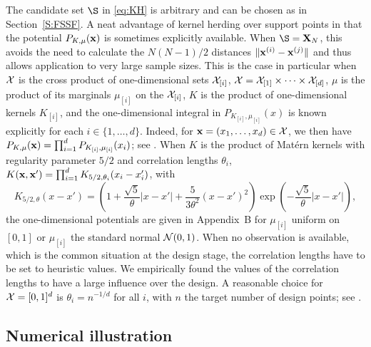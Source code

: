 The candidate set $\S$ in \eqref{eq:KH} is arbitrary and can be chosen as in Section~\ref{S:FSSF}. 
A neat advantage of kernel herding over support points in that the potential $P_{K,\mu}({\bf x})$ is sometimes explicitly available. When $\S=\bX_N$, this avoids the need to calculate the $N(N-1)/2$ distances $\|{\bf x}^{(i)}-{\bf x}^{(j)}\|$ and thus allows application to very large sample sizes. This is the case in particular when $\mathcal{X}$ is the cross product of one-dimensional sets $\mathcal{X}_{[i]}$, $\mathcal{X}=\mathcal{X}_{[1]}\times\cdots\times\mathcal{X}_{[d]}$, $\mu$ is the product of 
its marginals
$\mu_{[i]}$ on the $\mathcal{X}_{[i]}$, $K$ is the product of one-dimensional kernels $K_{[i]}$, and the one-dimensional integral in  $P_{K_{[i]},\mu_{[i]}}(x)$ is known explicitly for each $i\in\{1,\ldots,d\}$. Indeed, for ${\bf x}=(x_1,\ldots,x_d)\in\mathcal{X}$, we then have $P_{K,\mu}({\bf x})=\prod_{i=1}^d P_{K_{[i]},\mu_{[i]}}(x_i)$; see \cite{prozhi20}. When $K$ is the product of Mat\'ern kernels with regularity parameter $5/2$ and correlation lengths $\theta_i$, $K({\bf x},{\bf x}') = \prod_{i=1}^{d} K_{5/2,\theta_{i}}(x_{i}-x'_i)$, with
\begin{equation}\label{eq:Matern5/2}
K_{5/2,\theta}(x-x')
=
\left(1 + \frac{\sqrt{5}}{\theta} |x - x'| + \frac{5}{3 \theta^2} (x - x')^2 \right)
\exp \left( - \frac{\sqrt{5}}{\theta} |x - x'| \right),
\end{equation}
the one-dimensional potentials are given in Appendix~B for $\mu_{[i]}$ uniform on $[0,1]$ or $\mu_{[i]}$ the standard normal ${\mathcal{N}}(0,1)$.  
When no observation is available, which is the common situation at the design stage, the correlation lengths have to be set to heuristic values. We empirically found the values of the correlation lengths to have a large influence over the design. A reasonable choice for $\mathcal{X}=[0,1]^d$ is $\theta_i = n^{-1/d}$ for all $i$, with $n$ the target number of design points; see \cite{prozhi20}. 

\subsection{Numerical illustration}\label{S:numerical-1}

